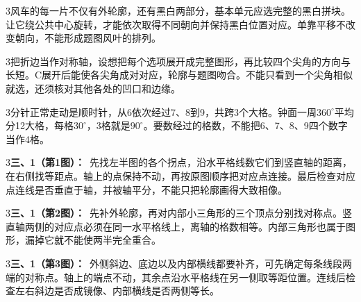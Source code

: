 \documentclass[multi=snippet,border={5bp 20bp 5bp 5bp}]{standalone}
\newenvironment{snippet}[3]{\begin{minipage}{#1bp}\color{answerred}\fontsize{#2}{#3}\selectfont\raggedright}{\end{minipage}}
\begin{document}
\begin{snippet}{505}{11.5}{14}\begin{multicols}{3}\raggedcolumns 风车的每一片不仅有外轮廓，还有黑白两部分，基本单元应选完整的黑白拼块。让它绕公共中心旋转，才能依次取得不同朝向并保持黑白位置对应。单靠平移不改变朝向，不能形成题图风叶的排列。\end{multicols}\end{snippet}
\begin{snippet}{505}{11.5}{14}\begin{multicols}{3}\raggedcolumns 把折边当作对称轴，设想把每个选项展开成完整图形，再比较四个尖角的方向与长短。C展开后能使各尖角成对对应，轮廓与题图吻合。不能只看到一个尖角相似就选，还须核对其他各处的凹口和边缘。\end{multicols}\end{snippet}
\begin{snippet}{505}{11.5}{14}\begin{multicols}{3}\raggedcolumns 分针正常走动是顺时针，从6依次经过7、8到9，共跨3个大格。钟面一周\(360^\circ\)\allowbreak 平均分12大格，每格\(30^\circ\)\allowbreak ，3格就是\(90^\circ\)\allowbreak 。要数经过的格数，不能把6、7、8、9四个数字当作4格。\end{multicols}\end{snippet}
\begin{snippet}{505}{11.5}{14}\begin{multicols}{3}\raggedcolumns \textbf{三、1（第1图）：}\ 先找左半图的各个拐点，沿水平格线数它们到竖直轴的距离，在右侧找等距点。轴上的点保持不动，再按原图顺序把对应点连接。最后检查对应点连线是否垂直于轴，并被轴平分，不能只把轮廓画得大致相像。\end{multicols}\end{snippet}
\begin{snippet}{505}{11.5}{14}\begin{multicols}{3}\raggedcolumns \textbf{三、1（第2图）：}\ 先补外轮廓，再对内部小三角形的三个顶点分别找对称点。竖直轴两侧的对应点必须在同一水平格线上，离轴的格数相等。内部三角形也属于图形，漏掉它就不能使两半完全重合。\end{multicols}\end{snippet}
\begin{snippet}{505}{11.5}{14}\begin{multicols}{3}\raggedcolumns \textbf{三、1（第3图）：}\ 外侧斜边、底边以及内部横线都要补齐，可先确定每条线段两端的对称点。轴上的端点不动，其余点沿水平格线在另一侧取等距位置。连线后检查左右斜边是否成镜像、内部横线是否两侧等长。\end{multicols}\end{snippet}
\end{document}
